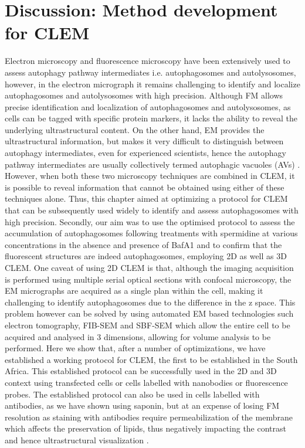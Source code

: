 \section{Discussion: Method development for CLEM}
Electron microscopy and fluorescence microscopy have been extensively used to assess autophagy pathway intermediates i.e. autophagosomes and autolysosomes, however, in the electron micrograph it remains challenging  to identify and localize autophagosomes and autolysosomes with high precision. Although FM allows precise identification and localization of autophagosomes and autolysosomes, as cells can be tagged with specific protein markers, it lacks the ability to reveal the underlying ultrastructural content. On the other hand, EM provides the ultrastructural information, but makes it very difficult to distinguish between autophagy intermediates, even for experienced scientists, hence the autophagy pathway intermediates are usually collectively termed autophagic vacuoles (AVs) \citep{Eskelinen2008,klionsky2016}. However, when both these two microscopy techniques are combined in CLEM, it is possible to reveal information that cannot be obtained using either of these techniques alone. Thus, this chapter aimed at optimizing a protocol for CLEM that can be subsequently used widely to identify and assess autophagosomes with high precision. Secondly, our aim was to use the optimised protocol to assess the accumulation of autophagosomes following treatments with spermidine at various concentrations in the absence and presence of BafA1 and to confirm that the fluorescent structures are indeed autophagosomes, employing 2D as well as 3D CLEM. One caveat of using 2D CLEM is that, although the imaging acquisition is performed using multiple serial optical sections with confocal microscopy, the EM micrographs are acquired as a single plan within the cell, making it challenging to identify autophagosomes due to the difference in the z space. This problem however can be solved by using automated EM based technologies such electron tomography, FIB-SEM and SBF-SEM \citep{Burel2018,Duke2014,Russell2017,Yla-Anttila2009} which allow the entire cell to be acquired and analysed in 3 dimensions, allowing for volume analysis to be performed. Here we show that, after a number of optimizations, we have established a working protocol for CLEM, the first to be established in the South Africa. This established protocol can be successfully used in the 2D and 3D context using transfected cells or cells labelled with nanobodies or fluorescence probes. The established protocol can also be used in cells labelled with antibodies, as we have shown using saponin, but at an expense of losing FM resolution as staining with antibodies require permeabilization of the membrane which affects the preservation of lipids, thus negatively impacting the contrast and hence ultrastructural visualization \citep{Eskelinen2008}.

